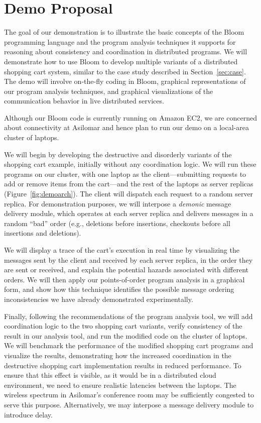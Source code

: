 \clearpage
\section{Demo Proposal}
\label{sec:demo}

The goal of our demonstration
is to illustrate the basic concepts of the Bloom programming language and the
program analysis techniques it supports for reasoning about consistency and
coordination in distributed programs.  We will demonstrate how to use Bloom to
develop multiple variants of a distributed shopping cart system, similar to the
case study described in Section~\ref{sec:case}.  The demo will involve
on-the-fly coding in Bloom, graphical representations of our program analysis
techniques, and graphical visualizations of the communication behavior in live
distributed services.

Although our Bloom code is currently running on Amazon EC2, we are concerned
about connectivity at Asilomar and hence plan to run our demo on a local-area
cluster of laptops.

We will begin by developing the destructive and disorderly variants of the
shopping cart example, initially without any coordination logic. We will run
these programs on our cluster, with one laptop as the client---submitting
requests to add or remove items from the cart---and the rest of the laptops as
server replicas (Figure~\ref{fig:demoarch}).  The client will dispatch each request to a random server
replica.  For demonstration purposes, we will interpose a \emph{demonic}
message delivery module, which operates at each server replica and delivers
messages in a random ``bad'' order (e.g., deletions before insertions,
checkouts before all insertions and deletions).

We will display a trace of the cart's execution in real time by visualizing the
messages sent by the client and received by each server replica, in the order
they are sent or received, and explain the potential hazards associated with
different orders. We will then apply our points-of-order program analysis in a
graphical form, and show how this technique identifies the possible message
ordering inconsistencies we have already demonstrated experimentally.

Finally, following the recommendations of the program analysis tool, we will
add coordination logic to the two shopping cart variants, verify consistency of
the result in our analysis tool, and run the modified code on the cluster of
laptops. We will benchmark the performance of the modified shopping cart
programs and visualize the results, demonstrating how the increased
coordination in the destructive shopping cart implementation results in reduced
performance. To ensure that this effect is visible, as it would be in a
distributed cloud environment, we need to ensure realistic latencies between
the laptops.  The wireless spectrum in Asilomar's conference room may be
sufficiently congested to serve this purpose.  Alternatively, we may interpose
a message delivery module to introduce delay.

